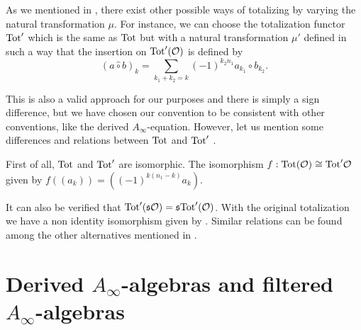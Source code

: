 \documentclass[join.tex]{subfiles}
\begin{document}
\begin{remark}\label{othermu}


As we mentioned in , there exist other possible ways of totalizing by varying the natural transformation $\mu$. For instance, we can choose the totalization functor $\mathrm{Tot}'$ which is the same as $\mathrm{Tot}$ but with a natural transformation $\mu'$ defined in such a way that the insertion on $\mathrm{Tot}'({\mathcal O})$ is defined by \[(a\hat{\circ}b)_k=\sum_{k_1+k_2=k}(-1)^{k_2n_1}a_{k_1}\circ b_{k_2}.\] 

This is also a valid approach for our purposes and there is simply a sign difference, but we have chosen our convention to be consistent with other conventions, like the derived $A_\infty$-equation. However, let us mention some differences and relations between $\mathrm{Tot}$ and $\mathrm{Tot}'$ . %

First of all, $\mathrm{Tot}$ and $\mathrm{Tot}'$ are isomorphic. The isomorphism $f:\mathrm{Tot}({\mathcal O})\cong \mathrm{Tot}'{\mathcal O}$ given by $f((a_k))=((-1)^{k(n_1-k)}a_k)$. %

It can also be verified that $\mathrm{Tot}'(\mathfrak{s}{\mathcal O})=\mathfrak{s} \mathrm{Tot}'({\mathcal O})$. With the original totalization we have a non identity isomorphism given by . Similar relations can be found among the other alternatives mentioned in . %



\end{remark}





\section{Derived $A_\infty$-algebras and filtered $A_\infty$-algebras}
\end{document}

